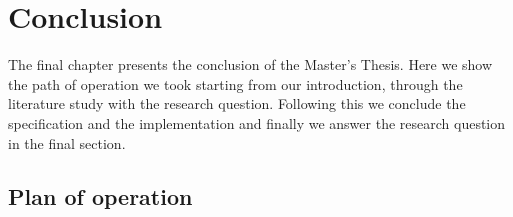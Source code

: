 \chapter{Conclusion}


The final chapter presents the conclusion of the Master's Thesis. Here we show the path of operation we took starting from our introduction, through the literature study with the research question. Following this we conclude the specification and the implementation and finally we answer the research question in the final section.

\section{Plan of operation}



